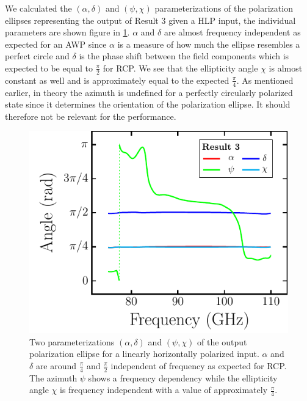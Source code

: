 We calculated the $(\alpha, \delta)$ and $(\psi, \chi)$ parameterizations of the polarization ellipses representing the output of Result 3 given a HLP input, the individual parameters are shown figure in \ref{fig:polymer_params_dotted}. $\alpha$ and $\delta$ are almost frequency independent as expected for an AWP since $\alpha$ is a measure of how much the ellipse resembles a perfect circle and $\delta$ is the phase shift between the field components which is expected to be equal to $\frac{\pi}{2}$ for RCP. We see that the ellipticity angle $\chi$ is almost constant as well and is approximately equal to the expected $\frac{\pi}{4}$. As mentioned earlier, in theory the azimuth is undefined for a perfectly circularly polarized state since it determines the orientation of the polarization ellipse. It should therefore not be relevant for the performance.

\begin{figure}[H]
    \centering
    \includegraphics[scale=0.65]{images/results/plots/polymer/params_dotted.pdf}
    \caption{Two parameterizations $(\alpha, \delta)$ and $(\psi, \chi)$ of the output polarization ellipse for a linearly horizontally polarized input. $\alpha$ and $\delta$ are around $\frac{\pi}{4}$ and $\frac{\pi}{2}$ independent of frequency as expected for RCP. The azimuth $\psi$ shows a frequency dependency while the ellipticity angle $\chi$ is frequency independent with a value of approximately $\frac{\pi}{4}$.}
    \label{fig:polymer_params_dotted}
\end{figure}

